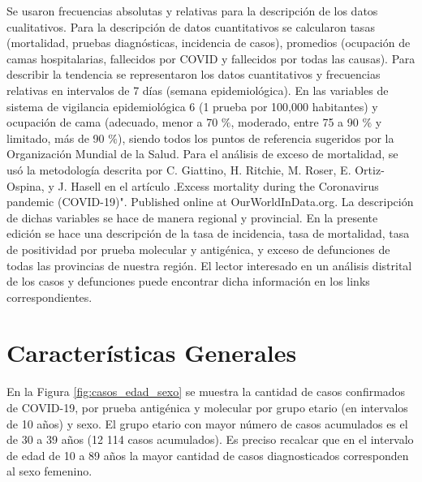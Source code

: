 \documentclass[12pt,a4paper,openany]{book}
\begin{document}
	Se usaron frecuencias absolutas y relativas para la descripción de los datos cualitativos. Para la
	descripción de datos cuantitativos se calcularon tasas (mortalidad, pruebas diagnósticas, incidencia de
	casos), promedios (ocupación de camas hospitalarias, fallecidos por COVID y fallecidos por todas las
	causas). Para describir la tendencia se representaron los datos cuantitativos y frecuencias relativas en
	intervalos de 7 días (semana epidemiológica). En las variables de sistema de vigilancia epidemiológica
	6
	(1 prueba por 100,000 habitantes) y ocupación de cama (adecuado, menor a 70 $\%$, moderado,
	entre 75 a 90  $\%$ y limitado, más de 90 $\%$), siendo todos los puntos de referencia sugeridos por la
	Organización Mundial de la Salud. Para el análisis de exceso de mortalidad, se usó la metodología
	descrita por C. Giattino, H. Ritchie, M. Roser, E. Ortiz-Ospina, y J. Hasell en el artículo .Excess
	mortality during the Coronavirus pandemic (COVID-19)". Published online at OurWorldInData.org.
	La descripción de dichas variables se hace de manera regional y provincial. En la presente edición
	se hace una descripción de la tasa de incidencia, tasa de mortalidad, tasa de positividad por prueba
	molecular y antigénica, y exceso de defunciones de todas las provincias de nuestra región. El lector
	interesado en un análisis distrital de los casos y defunciones puede encontrar dicha información en
	los links correspondientes.
	
	
	\clearpage	
	\section*{Características Generales}
	
	
	
	\noindent En la Figura \ref{fig:casos_edad_sexo} se muestra la cantidad de casos confirmados de COVID-19, por prueba antigénica y molecular por grupo etario (en intervalos de 10 años) y sexo. El grupo etario con mayor número de casos acumulados es el de 30 a 39 años (12 114 casos acumulados). 	Es preciso recalcar que en el intervalo de edad de 10 a 89 años la mayor cantidad de casos diagnosticados corresponden al sexo femenino.  
	
\end{document}
